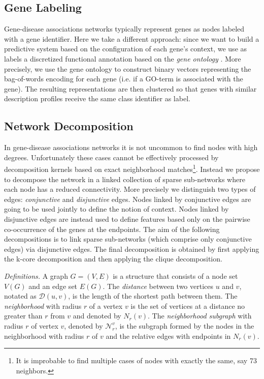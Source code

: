 \documentclass{esannV2}
\begin{document}
\subsection{Gene Labeling} Gene-disease associations networks typically
represent genes as nodes labeled with a gene identifier. Here we take a
different approach: since we want to build a predictive system based on the
configuration of each gene's context, we use as labels a discretized
functional annotation based on the \textit{gene ontology} \cite{ontology}.
More precisely,  we use the gene ontology to construct binary vectors
representing the bag-of-words encoding for each gene (i.e. if a GO-term is
associated with the gene). The resulting representations are then clustered so
that genes with similar description profiles receive the same class identifier
as label.



\subsection{Network Decomposition} 

In gene-disease associations networks it is not uncommon to find nodes with
high degrees. Unfortunately these cases cannot be effectively processed by
decomposition kernels based on exact neighborhood matches\footnote{It is
improbable to find multiple cases of nodes with exactly the same, say 73
neighbors.}. Instead we propose to decompose the network in a linked
collection of sparse sub-networks where each node has a reduced connectivity.
More precisely we distinguish two types of edges: {\em conjunctive} and {\em
disjunctive} edges. Nodes linked by conjunctive edges are going to be used
jointly to define the notion of context. Nodes linked by disjunctive edges are
instead used to define features based only on the pairwise co-occurrence of
the genes at the endpoints. The aim of the following decompositions is to link
sparse sub-networks (which comprise only conjunctive edges) via disjunctive
edges. The final decomposition is obtained by first applying the k-core
decomposition and then applying the clique decomposition.


\textit{Definitions.} A graph $G = (V,E)$ is a structure that
consists of a node set $V(G)$ and an edge set $E(G)$. The
\textit{distance} between two vertices $u$ and $v$, notated as
$\mathcal{D}(u,v)$, is the length of the shortest path between them. The
\textit{neighborhood} with radius $r$ of a vertex $v$ is the set of vertices
at a distance no greater than $r$ from $v$ and denoted by $N_r(v)$. 
The \textit{neighborhood subgraph} with radius $r$ of vertex $v$, denoted by
$\mathcal{N}_{r}^{v}$,  is the subgraph formed by the nodes in the
neighborhood with radius $r$ of $v$ and the relative edges with endpoints in
$N_r(v)$.
\end{document}
